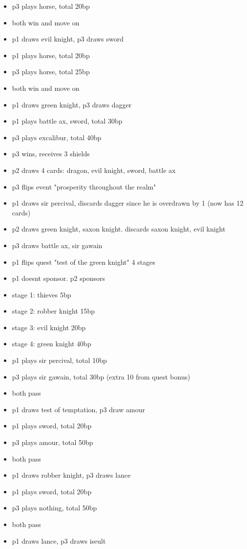 \documentclass[11pt]{article}
\begin{document}
\begin{enumerate}
\begin{itemize}
	\item p3 plays horse, total 20bp
	\item both win and move on
	\item p1 draws evil knight, p3 draws sword
	\item p1 plays horse, total 20bp
	\item p3 plays horse, total 25bp
	\item both win and move on
	\item p1 draws green knight, p3 draws dagger
	\item p1 plays battle ax, sword, total 30bp
	\item p3 plays excalibur, total 40bp
	\item p3 wins, receives 3 shields
	\item p2 draws 4 cards: dragon, evil knight, sword, battle ax
	\item p3 flips event "prosperity throughout the realm"
	\item p1 draws sir percival, discards dagger since he is overdrawn by 1 (now has 12 cards)
	\item p2 draws green knight, saxon knight. discards saxon knight, evil knight
	\item p3 draws battle ax, sir gawain
	\item p1 flips quest "test of the green knight" 4 stages
	\item p1 doesnt sponsor. p2 sponsors
	\item stage 1: thieves 5bp
	\item stage 2: robber knight 15bp
	\item stage 3: evil knight 20bp
	\item stage 4: green knight 40bp
	\item p1 plays sir percival, total 10bp
	\item p3 plays sir gawain, total 30bp (extra 10 from quest bonus)
	\item both pass
	\item p1 draws test of temptation, p3 draw amour
	\item p1 plays sword, total 20bp
	\item p3 plays amour, total 50bp
	\item both pass
	\item p1 draws robber knight, p3 draws lance
	\item p1 plays sword, total 20bp
	\item p3 plays nothing, total 50bp
	\item both pass
	\item p1 draws lance, p3 draws iseult

\end{itemize}
\end{enumerate}
\end{document}
